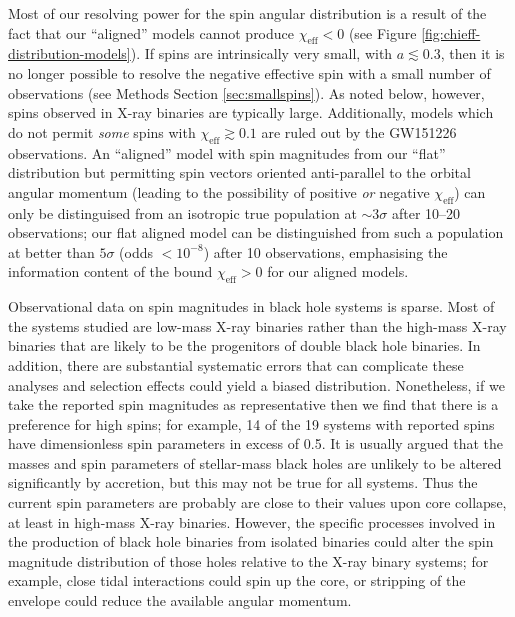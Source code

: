 \documentclass{nature}
\newcommand{\chieff}{\chi_\mathrm{eff}}
\begin{document}
Most of our resolving power for the spin angular distribution is a
result of the fact that our ``aligned'' models cannot produce
$\chieff < 0$ (see Figure \ref{fig:chieff-distribution-models}).  If
spins are intrinsically very small, with $a \lesssim 0.3$, then it is
no longer possible to resolve the negative effective spin with a small
number of observations (see Methods Section \ref{sec:smallspins}).  As
noted below, however, spins observed in X-ray binaries are typically
large.  Additionally, models which do not permit \emph{some} spins
with $\chieff \gtrsim 0.1$ are ruled out by the GW151226
observations\cite{2016PhRvL.116x1103A}.  An ``aligned'' model with
spin magnitudes from our ``flat'' distribution but permitting spin
vectors oriented anti-parallel to the orbital angular momentum
(leading to the possibility of positive \emph{or} negative $\chieff$)
can only be distinguised from an isotropic true population at
$\sim 3 \sigma$ after 10--20 observations\cite{2017CQGra..34cLT01V};
our flat aligned model can be distinguished from such a population at
better than $5\sigma$ (odds $< 10^{-8}$) after 10 observations,
emphasising the information content of the bound $\chieff > 0$ for our
aligned models.

Observational data on spin magnitudes in black hole systems is
sparse\cite{2015PhR...548....1M}.  Most of the systems studied are
low-mass X-ray binaries rather than the high-mass X-ray binaries that
are likely to be the progenitors of double black hole binaries.  In
addition, there are substantial systematic errors that can complicate
these analyses\cite{2015PhR...548....1M} and selection effects could
yield a biased distribution. Nonetheless, if we take the reported spin
magnitudes as representative then we find that there is a preference
for high spins; for example, 14 of the 19 systems with reported spins
have dimensionless spin parameters in excess of 0.5.  It is usually
argued that the masses and spin parameters of stellar-mass black holes
are unlikely to be altered significantly by
accretion\cite{1999MNRAS.305..654K}, but this may not be true for all
systems\cite{2003MNRAS.341..385P,2015ApJ...800...17F}.  Thus the
current spin parameters are probably are close to their values upon
core collapse, at least in high-mass X-ray binaries.  However, the
specific processes involved in the production of black hole binaries
from isolated binaries could alter the spin magnitude distribution of
those holes relative to the X-ray binary systems; for example, close
tidal interactions could spin up the core, or stripping of the
envelope could reduce the available angular
momentum\cite{2016MNRAS.462..844K,2017arXiv170200885Z,2017arXiv170203952H}.
\end{document}
